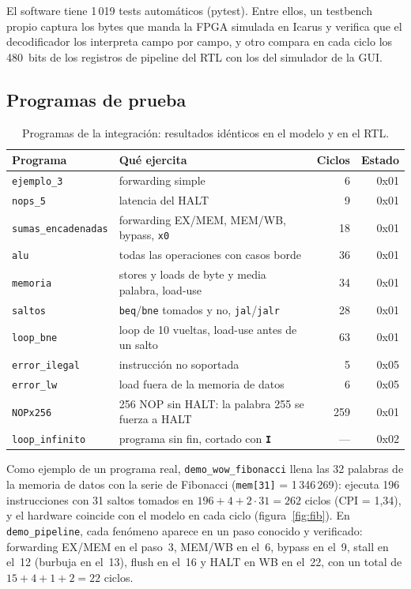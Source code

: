 \documentclass[12pt,a4paper]{article}
\newcommand{\cmd}[1]{\textbf{\texttt{#1}}}
\begin{document}
El software tiene 1\,019 tests automáticos (pytest). Entre ellos, un testbench
propio captura los bytes que manda la FPGA simulada en Icarus y verifica que el
decodificador los interpreta campo por campo, y otro compara en cada ciclo los
480~bits de los registros de pipeline del RTL con los del simulador de la GUI.

\subsection{Programas de prueba}

\begin{table}[H]
\centering
\small
\begin{tabular}{@{}lL{6.6cm}rr@{}}
\toprule
Programa & Qué ejercita & Ciclos & Estado \\
\midrule
\texttt{ejemplo\_3} & forwarding simple & 6 & 0x01 \\
\texttt{nops\_5} & latencia del HALT & 9 & 0x01 \\
\texttt{sumas\_encadenadas} & forwarding EX/MEM, MEM/WB, bypass, \texttt{x0} & 18 & 0x01 \\
\texttt{alu} & todas las operaciones con casos borde & 36 & 0x01 \\
\texttt{memoria} & stores y loads de byte y media palabra, load-use & 34 & 0x01 \\
\texttt{saltos} & \texttt{beq}/\texttt{bne} tomados y no, \texttt{jal}/\texttt{jalr} & 28 & 0x01 \\
\texttt{loop\_bne} & loop de 10 vueltas, load-use antes de un salto & 63 & 0x01 \\
\texttt{error\_ilegal} & instrucción no soportada & 5 & 0x05 \\
\texttt{error\_lw} & load fuera de la memoria de datos & 6 & 0x05 \\
\texttt{NOPx256} & 256 NOP sin HALT: la palabra 255 se fuerza a HALT & 259 & 0x01 \\
\texttt{loop\_infinito} & programa sin fin, cortado con \cmd{I} & --- & 0x02 \\
\bottomrule
\end{tabular}
\caption{Programas de la integración: resultados idénticos en el modelo y en el RTL.}
\end{table}

Como ejemplo de un programa real, \texttt{demo\_wow\_fibonacci} llena las 32
palabras de la memoria de datos con la serie de Fibonacci
(\texttt{mem[31]} = 1\,346\,269): ejecuta 196 instrucciones con 31 saltos
tomados en $196 + 4 + 2 \cdot 31 = 262$ ciclos (CPI = 1,34), y el hardware
coincide con el modelo en cada ciclo (figura~\ref{fig:fib}). En
\texttt{demo\_pipeline}, cada fenómeno aparece en un paso conocido y verificado:
forwarding EX/MEM en el paso~3, MEM/WB en el~6, bypass en el~9, stall en el~12
(burbuja en el~13), flush en el~16 y HALT en WB en el~22, con un total de
$15 + 4 + 1 + 2 = 22$ ciclos.
\end{document}
